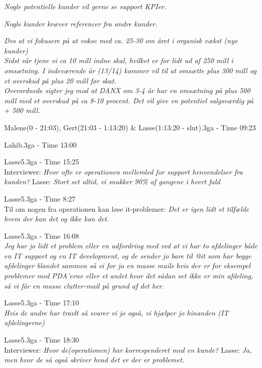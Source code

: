 \begin{thebibliography}{9}
	\textit{Nogle potentielle kunder vil gerne se support KPIer.}

	\textit{Nogle kunder kræver referencer fra andre kunder.}

	\textit{Dvs at vi fokusere på at vokse med ca. 25-30 om året i organisk vækst (nye kunder)}\\
\textit{Sidst eår tjene vi ca 10 mill indne skal, hvilket er for lidt ud af 250 mill i omsætning. I indeværende år (13/14) kommer vil til at omsætte plus 300 mill og et overskud på plus 20 mill før skat.}\\
\textit{Overordnede sigter jeg mod at DANX om 3-4 år har en omsætning på plus 500 mill med et overskud på ca 8-10 procent. Det vil give en potentiel salgsværdig på + 500 mill.}

	Malene(0 - 21:03), Gert(21:03 - 1:13:20) \& Lasse(1:13:20 - slut).3ga - Time 09:23

	Lahib.3ga - Time 13:00

	Lasse5.3ga - Time 15:25 \\
	Interviewer: \textit{Hvor ofte er operationen mellemled for support henvendelser fra kunden?} Lasse: \textit{Stort set altid, vi snakker 90\% af gangene i hvert fald}

	Lasse5.3ga - Time 8:27 \\
	Til om nogen fra operationen kan løse it-problemer: \textit{Det er igen lidt et tilfælde hvem der kan det og ikke kan det.}

	Lasse5.3ga - Time 16:08 \\
	\textit{Jeg har jo lidt et problem eller en udfordring med ved at vi har to afdelinger både en IT support og en IT development, og de sender jo bare til @it som har begge afdelinger blandet sammen så vi for jo en masse mails hvis der er for eksempel problemer med PDA’erne eller et andet hvor det sådan set ikke er min afdeling, så vi får en masse clutter-mail på grund af det her.}

	Lasse5.3ga - Time 17:10 \\
	\textit{Hvis de andre har travlt så svarer vi jo også, vi hjælper jo hinanden (IT afdelingerne)}

	Lasse5.3ga - Time 18:30 \\
	Interviewer: \textit{Hvor de(operationen) har korrespenderet med en kunde?} Lasse: \textit{Ja, men hvor de så også skriver hvad det er der er problemet.}


\end{thebibliography}
